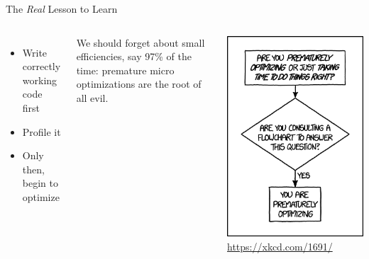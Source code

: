 
\begin{frame}{The \emph{Real} Lesson to Learn}
%
\begin{columns}
\begin{itemize}
\item Write correctly working code first
\item Profile it
\item Only then, begin to optimize
\end{itemize}

\vspace{6pt}
\begin{hintbox}
We should forget about small efficiencies, say 97\% of the time: premature micro optimizations are the root of all evil.
\end{hintbox}
%
\begin{center}
\includegraphics[width=.8\linewidth]{./gfx/02-xkcd-premature-optimization}
\scriptsize
\url{https://xkcd.com/1691/}
\end{center}
\end{columns}
%
\end{frame}

